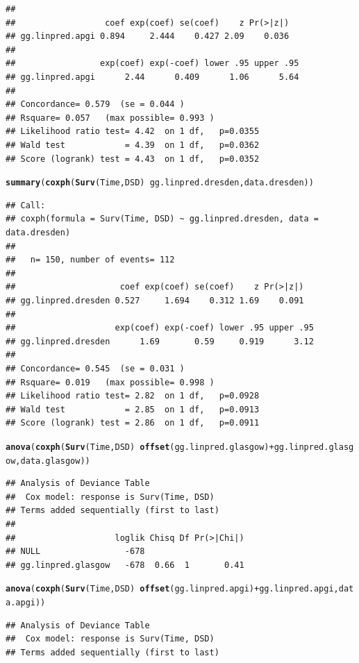 \documentclass{article}\usepackage[]{graphicx}\usepackage[]{color}
\makeatletter
\newcommand{\hlopt}[1]{\textcolor[rgb]{0,0,0}{#1}}%
\newcommand{\hlstd}[1]{\textcolor[rgb]{0.345,0.345,0.345}{#1}}%
\newcommand{\hlkwd}[1]{\textcolor[rgb]{0.737,0.353,0.396}{\textbf{#1}}}%
\newenvironment{kframe}{%
 \def\at@end@of@kframe{}%
 \ifinner\ifhmode%
  \def\at@end@of@kframe{\end{minipage}}%
  \begin{minipage}{\columnwidth}%
 \fi\fi%
 \def\FrameCommand##1{\hskip\@totalleftmargin \hskip-\fboxsep
 \colorbox{shadecolor}{##1}\hskip-\fboxsep
     \hskip-\linewidth \hskip-\@totalleftmargin \hskip\columnwidth}%
 \MakeFramed {\advance\hsize-\width
   \@totalleftmargin\z@ \linewidth\hsize
   \@setminipage}}%
 {\par\unskip\endMakeFramed%
 \at@end@of@kframe}
\newenvironment{knitrout}{}{} %
\makeatother
\begin{document}
\begin{knitrout}
\begin{kframe}
\begin{verbatim}
## 
##                  coef exp(coef) se(coef)    z Pr(>|z|)
## gg.linpred.apgi 0.894     2.444    0.427 2.09    0.036
## 
##                 exp(coef) exp(-coef) lower .95 upper .95
## gg.linpred.apgi      2.44      0.409      1.06      5.64
## 
## Concordance= 0.579  (se = 0.044 )
## Rsquare= 0.057   (max possible= 0.993 )
## Likelihood ratio test= 4.42  on 1 df,   p=0.0355
## Wald test            = 4.39  on 1 df,   p=0.0362
## Score (logrank) test = 4.43  on 1 df,   p=0.0352
\end{verbatim}
\begin{alltt}
\hlkwd{summary}\hlstd{(}\hlkwd{coxph}\hlstd{(}\hlkwd{Surv}\hlstd{(Time, DSD)} \hlopt{~} \hlstd{gg.linpred.dresden, data.dresden))}
\end{alltt}
\begin{verbatim}
## Call:
## coxph(formula = Surv(Time, DSD) ~ gg.linpred.dresden, data = data.dresden)
## 
##   n= 150, number of events= 112 
## 
##                     coef exp(coef) se(coef)    z Pr(>|z|)
## gg.linpred.dresden 0.527     1.694    0.312 1.69    0.091
## 
##                    exp(coef) exp(-coef) lower .95 upper .95
## gg.linpred.dresden      1.69       0.59     0.919      3.12
## 
## Concordance= 0.545  (se = 0.031 )
## Rsquare= 0.019   (max possible= 0.998 )
## Likelihood ratio test= 2.82  on 1 df,   p=0.0928
## Wald test            = 2.85  on 1 df,   p=0.0913
## Score (logrank) test = 2.86  on 1 df,   p=0.0911
\end{verbatim}
\begin{alltt}
\hlkwd{anova}\hlstd{(}\hlkwd{coxph}\hlstd{(}\hlkwd{Surv}\hlstd{(Time, DSD)} \hlopt{~} \hlkwd{offset}\hlstd{(gg.linpred.glasgow)} \hlopt{+} \hlstd{gg.linpred.glasgow, data.glasgow))}
\end{alltt}
\begin{verbatim}
## Analysis of Deviance Table
##  Cox model: response is Surv(Time, DSD)
## Terms added sequentially (first to last)
## 
##                    loglik Chisq Df Pr(>|Chi|)
## NULL                 -678                    
## gg.linpred.glasgow   -678  0.66  1       0.41
\end{verbatim}
\begin{alltt}
\hlkwd{anova}\hlstd{(}\hlkwd{coxph}\hlstd{(}\hlkwd{Surv}\hlstd{(Time, DSD)} \hlopt{~} \hlkwd{offset}\hlstd{(gg.linpred.apgi)} \hlopt{+} \hlstd{gg.linpred.apgi, data.apgi))}
\end{alltt}
\begin{verbatim}
## Analysis of Deviance Table
##  Cox model: response is Surv(Time, DSD)
## Terms added sequentially (first to last)

\end{verbatim}
\end{kframe}
\end{knitrout}
\end{document}
